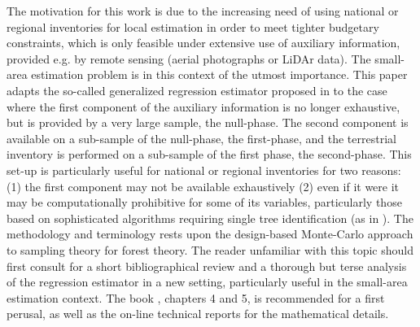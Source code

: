 \documentclass[a4paper,12pt,leqno, titlepage]{article}
\begin{document}
The motivation for this work is due to the increasing need of using national or regional inventories for local estimation in order to meet tighter budgetary constraints, which is only feasible under extensive use of auxiliary information, provided e.g. by remote sensing (aerial photographs or LiDAr data). The small-area estimation problem is in this context of the utmost importance. This paper adapts the so-called generalized regression estimator proposed in \cite{mandallaz4} to the case where the first component of the auxiliary information is no longer exhaustive, but is provided by a very large sample, the null-phase. The second component is available on a sub-sample of the null-phase, the first-phase, and the terrestrial inventory is performed on a sub-sample of the first phase, the second-phase. This set-up is particularly useful for national or regional inventories for two reasons: (1) the first component may not be available exhaustively (2) even if it were it may be computationally prohibitive for some of its variables, particularly those based on sophisticated algorithms requiring single tree identification (as in \cite{mandallaz4}). The methodology and terminology rests upon the design-based Monte-Carlo approach to sampling theory for forest theory. The reader unfamiliar with this topic should first consult \cite{mandallaz3} for a short bibliographical review and a thorough but terse analysis of the regression estimator in a new setting, particularly useful in the small-area estimation context. The book \cite{mandallaz}, chapters 4 and 5, is recommended for a first perusal, as well as the on-line technical reports \cite{mandallazreport1,mandallazreport2} for the mathematical details. \\
\end{document}
